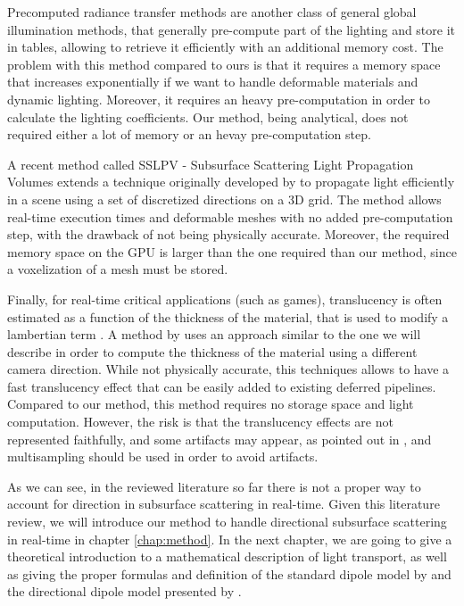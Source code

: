 Precomputed radiance transfer methods are another class of general global illumination methods, that generally pre-compute part of the lighting and store it in tables\citep{Donner:2009:EBM:1531326.1531336}, allowing to retrieve it efficiently with an additional memory cost. The problem with this method compared to ours is that it requires a memory space that increases exponentially if we want to handle deformable materials and dynamic lighting. Moreover, it requires an heavy pre-computation in order to calculate the lighting coefficients. Our method, being analytical, does not required either a lot of memory or an hevay pre-computation step. 

A recent method called SSLPV - Subsurface Scattering Light Propagation Volumes \citep{Borlum:2011:SSL:2018323.2018325} extends a technique originally developed by \cite{Kaplanyan:2010:CLP:1730804.1730821} to propagate light efficiently in a scene using a set of discretized directions on a 3D grid. The method allows real-time execution times and deformable meshes with no added pre-computation step, with the drawback of not being physically accurate. Moreover, the required memory space on the GPU is larger than the one required than our method, since a voxelization of a mesh must be stored. 

Finally, for real-time critical applications (such as games), translucency is often estimated as a function of the thickness of the material, that is used to modify a lambertian term \citep{Tomaszewska2012,greenrtss}. A method by \cite{Kosaka:2012:RAR:2407156.2407206} uses an approach similar to the one we will describe in order to compute the thickness of the material using a different camera direction. While not physically accurate, this techniques allows to have a fast translucency effect that can be easily added to existing deferred pipelines. Compared to our method, this method requires no storage space and light computation. However, the risk is that the translucency effects are not represented faithfully, and some artifacts may appear, as pointed out in \cite{greenrtss}, and multisampling should be used in order to avoid artifacts. 

As we can see, in the reviewed literature so far there is not a proper way to account for direction in subsurface scattering in real-time. Given this literature review, we will introduce our method to handle directional subsurface scattering in real-time in chapter \ref{chap:method}. In the next chapter, we are going to give a theoretical introduction to a mathematical description of light transport, as well as giving the proper formulas and definition of the standard dipole model by \cite{Jensen:2001:PMS:383259.383319} and the directional dipole model presented by \cite{IMM2013-06646}.
